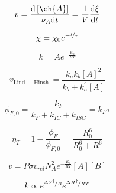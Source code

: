 \documentclass[12pt, letterpaper]{memoir}
\begin{document}
\noindent
\begin{minipage}[t]{0.5\linewidth}
	\begin{equation*}
		v = \frac{\mathrm{d}\left[\ch{A}\right]}{\nu_A\mathrm{d}t}=\dfrac{1}{V}\dfrac{\mathrm{d}\xi}{\mathrm{d}t}
	\end{equation*}

	\begin{equation*}
		\chi = \chi_0e^{-\nicefrac{t}{\tau}} 
	\end{equation*}

	\begin{equation*}
		k = Ae^{-\frac{E_a}{RT}}
	\end{equation*}

	\begin{equation*}
		v_{\mathrm{Lind.-Hinsh.}} = \dfrac{k_ak_b[A]^2}{k_b+k^\prime_a[A]}
	\end{equation*}

	\begin{equation*}
		\phi_{F,0}=\dfrac{k_F}{k_F+k_{IC}+k_{ISC}}= k_F\tau
	\end{equation*}

	\begin{equation*}
		\eta_T = 1 - \dfrac{\phi_F}{\phi_{F,0}} = \dfrac{R_0^6}{R_0^6 + R^6}
	\end{equation*}

	\begin{equation*}
		v= P\sigma v_{rel}N_A^2e^{-\frac{E_a}{RT}}[A][B]
	\end{equation*}

	
	\begin{equation*}
		k\propto e^{\nicefrac{\Delta S^{\ddagger}}{R}}e^{\nicefrac{\Delta H^{\ddagger}}{RT}}
	\end{equation*}
\end{minipage}
\end{document}
